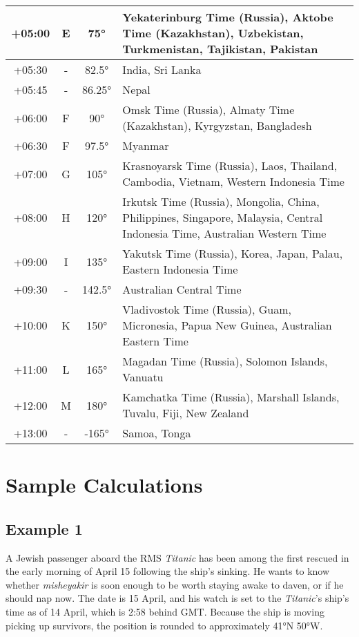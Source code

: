 \begin{footnotesize}
\begin{tabular}{c | c | c | p{}}
	+05:00&E&75°&Yekaterinburg Time (Russia), Aktobe Time (Kazakhstan), Uzbekistan, Turkmenistan, Tajikistan, Pakistan\\\hline
	+05:30& - &82.5°&India, Sri Lanka\\\hline
	+05:45& - &86.25°&Nepal\\\hline
	+06:00&F&90°&Omsk Time (Russia), Almaty Time (Kazakhstan), Kyrgyzstan, Bangladesh\\\hline
	+06:30&F&97.5°&Myanmar\\\hline
	+07:00&G&105°&Krasnoyarsk Time (Russia), Laos, Thailand, Cambodia, Vietnam, Western Indonesia Time\\\hline
	+08:00&H&120°&Irkutsk Time (Russia), Mongolia, China, Philippines, Singapore, Malaysia, Central Indonesia Time, Australian Western Time\\\hline
	+09:00&I&135°&Yakutsk Time (Russia), Korea, Japan, Palau, Eastern Indonesia Time\\\hline
	+09:30& - &142.5°&Australian Central Time\\\hline
	+10:00&K&150°&Vladivostok Time (Russia), Guam, Micronesia, Papua New Guinea, Australian Eastern Time\\\hline
	+11:00&L&165°&Magadan Time (Russia), Solomon Islands, Vanuatu\\\hline
	+12:00&M&180°&Kamchatka Time (Russia), Marshall Islands, Tuvalu, Fiji, New Zealand\\\hline
	+13:00& - &-165°&Samoa, Tonga\\\hline
\end{tabular}\end{footnotesize}

\section{Sample Calculations}

\subsection{Example 1}

A Jewish passenger aboard the RMS \textit{Titanic} has been among the first rescued in the early morning of April 15 following the ship's sinking. He wants to know whether \textit{misheyakir} is soon enough to be worth staying awake to daven, or if he should nap now. The date is 15 April, and his watch is set to the \textit{Titanic}'s ship's time as of 14 April, which is 2:58 behind GMT.  Because the ship is moving picking up survivors, the position is rounded to approximately 41°N 50°W.

